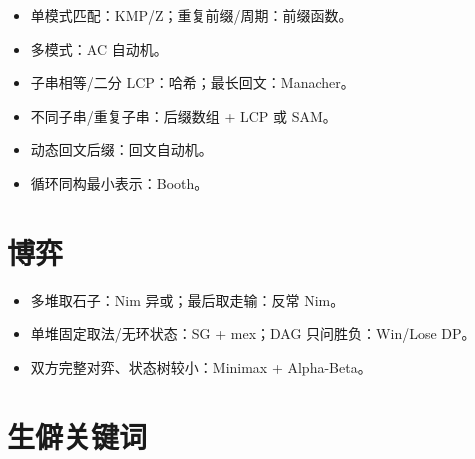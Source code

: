 \begin{itemize}
\tightlist
\item
  单模式匹配：KMP/Z；重复前缀/周期：前缀函数。
\item
  多模式：AC 自动机。
\item
  子串相等/二分 LCP：哈希；最长回文：Manacher。
\item
  不同子串/重复子串：后缀数组 + LCP 或 SAM。
\item
  动态回文后缀：回文自动机。
\item
  循环同构最小表示：Booth。
\end{itemize}

\section{博弈}\label{ux535aux5f08}

\begin{itemize}
\tightlist
\item
  多堆取石子：Nim 异或；最后取走输：反常 Nim。
\item
  单堆固定取法/无环状态：SG + mex；DAG 只问胜负：Win/Lose DP。
\item
  双方完整对弈、状态树较小：Minimax + Alpha-Beta。
\end{itemize}

\section{生僻关键词}\label{ux751fux50fbux5173ux952eux8bcd}

